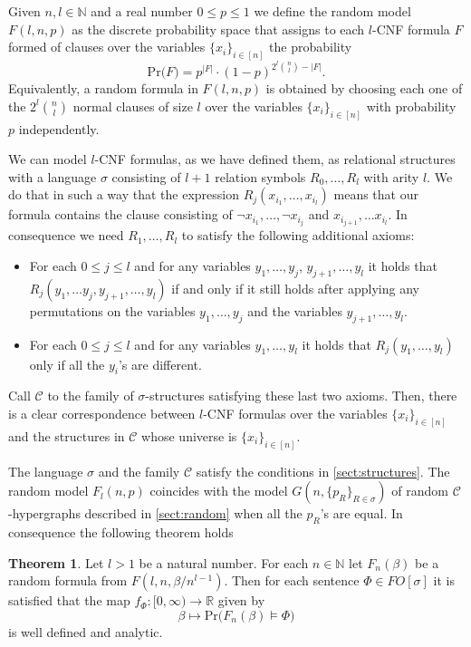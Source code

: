 \documentclass[12pt,notitlepage,a4paper]{article}
\theoremstyle{definition}
\newtheorem{theorem}{Theorem}[section]
\newcommand{\R}{\mathbb{R}}
\newcommand{\N}{\mathbb{N}}
\newcommand{\PR}[1]{\mathrm{Pr}\big(#1\big)}
\begin{document}
Given $n, l \in \N$ and a real number $0\leq p \leq 1$ we define
the random model $F(l,n,p)$ as the discrete probability space that
assigns to each $l$-CNF formula $F$ formed of clauses over
the variables $\{x_i\}_{i\in [n]}$
 the probability
\[
\PR{F}= p^{|F|}\cdot (1-p)^{2^l\binom{n}{l}-|F|}.
\] 
Equivalently, a random formula in $F(l,n,p)$ is obtained
by choosing each one of the $2^l\binom{n}{l}$ normal 
clauses of size $l$ over the variables $\{x_i\}_{i\in [n]}$
with probability $p$ independently. \par	
We can model $l$-CNF formulas, as we have defined them, as relational 
structures with a language $\sigma$ consisting of $l+1$ relation symbols
$R_0,\dots, R_l$ with arity $l$. We do that in such a way that the expression
$R_j(x_{i_1},\dots,x_{i_l})$ means that our formula contains the clause
consisting of $\neg x_{i_1}, \dots, \neg x_{i_j}$ and $x_{i_{j+1}},\dots
x_{i_l}$. In consequence we need $R_1,\dots, R_l$ to satisfy the 
following additional axioms:
\begin{itemize}
	\item For each $0\leq j \leq l$ and 
	for any variables $y_1,\dots,y_j$, $y_{j+1},\dots, y_l$ it holds that
	 $R_j(y_1,\dots y_j, y_{j+1},\dots, y_l)$ if and only if it still holds after 
	 applying any permutations on the variables $y_1,\dots,y_j$ and the variables
	 $y_{j+1},\dots,y_l$.
	 \item For each $0\leq j \leq l$ and 
	 for any variables $y_1,\dots, y_l$ it holds that
	 $R_j(y_1,\dots, y_l)$ only if all the $y_i$'s are different. 
\end{itemize}
Call $\mathcal{C}$ to the family of $\sigma$-structures satisfying these last two axioms.
Then, there is a clear correspondence between $l$-CNF formulas over the variables
$\{x_i\}_{i\in [n]}$ and the structures in $\mathcal{C}$ whose universe is 
$\{x_i\}_{i\in [n]}$. \par
The language $\sigma$ and the family $\mathcal{C}$ satisfy the conditions in 
\cref{sect:structures}. The random model $F_l(n,p)$ coincides with the model
$G(n,\{p_R\}_{R\in \sigma})$ of random $\mathcal{C}$-hypergraphs described in 
\cref{sect:random} when all the $p_R$'s are equal. In consequence the following theorem 
holds
\begin{theorem} \label{thm:mainsat}
	Let $l>1$ be a natural number.
	For each $n\in \N$ let $F_n(\beta)$ be a random formula from
	$F(l,n,\beta/n^{l-1})$. Then for each sentence $\Phi\in FO[\sigma]$ 
	it is satisfied
	that the map $f_\Phi: [0,\infty) \rightarrow \R$ given by
	\[
	\beta \mapsto \PR{ F_n(\beta)\models \Phi}
	\]
	is well defined and analytic. 
\end{theorem}
\end{document}

